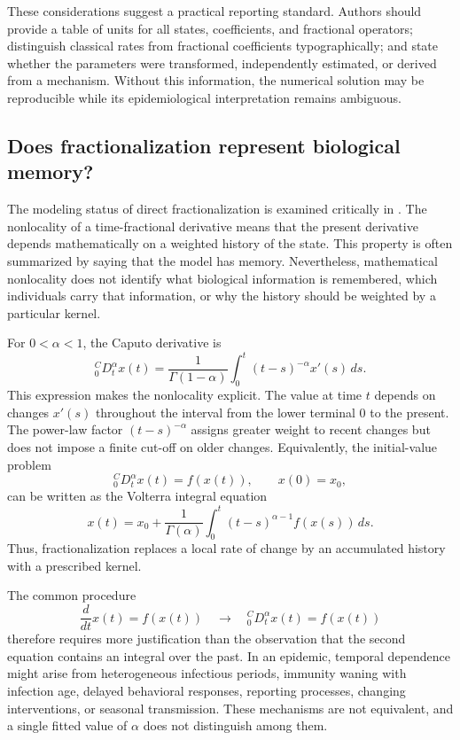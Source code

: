 \documentclass[00-main.tex]{subfiles}
\begin{document}
These considerations suggest a practical reporting standard.
Authors should provide a table of units for all states, coefficients, and fractional operators; distinguish classical rates from fractional coefficients typographically; and state whether the parameters were transformed, independently estimated, or derived from a mechanism.
Without this information, the numerical solution may be reproducible while its epidemiological interpretation remains ambiguous.

\subsection{Does fractionalization represent biological memory?}

The modeling status of direct fractionalization is examined critically in \cite{Cu26}.
The nonlocality of a time-fractional derivative means that the present derivative depends mathematically on a weighted history of the state.
This property is often summarized by saying that the model has memory.
Nevertheless, mathematical nonlocality does not identify what biological information is remembered, which individuals carry that information, or why the history should be weighted by a particular kernel.

For $0<\alpha<1$, the Caputo derivative is
\[
{}_{0}^{C}\!D_t^{\alpha}x(t)
=\frac{1}{\Gamma(1-\alpha)}
\int_{0}^{t}(t-s)^{-\alpha}x'(s)\,ds.
\]
This expression makes the nonlocality explicit.
The value at time $t$ depends on changes $x'(s)$ throughout the interval from the lower terminal $0$ to the present.
The power-law factor $(t-s)^{-\alpha}$ assigns greater weight to recent changes but does not impose a finite cut-off on older changes.
Equivalently, the initial-value problem
\[
{}_{0}^{C}\!D_t^{\alpha}x(t)=f(x(t)),
\qquad x(0)=x_0,
\]
can be written as the Volterra integral equation
\[
x(t)=x_0+
\frac{1}{\Gamma(\alpha)}
\int_{0}^{t}(t-s)^{\alpha-1}f(x(s))\,ds.
\]
Thus, fractionalization replaces a local rate of change by an accumulated history with a prescribed kernel.

The common procedure
\[
\frac{d}{dt}x(t)=f(x(t))
\quad\longrightarrow\quad
{}_{0}^{C}\!D_t^{\alpha}x(t)=f(x(t))
\]
therefore requires more justification than the observation that the second equation contains an integral over the past.
In an epidemic, temporal dependence might arise from heterogeneous infectious periods, immunity waning with infection age, delayed behavioral responses, reporting processes, changing interventions, or seasonal transmission.
These mechanisms are not equivalent, and a single fitted value of $\alpha$ does not distinguish among them.
\end{document}
